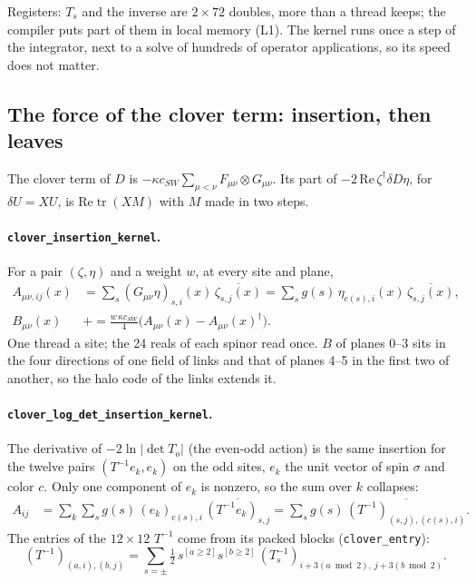 \documentclass[11pt,a4paper]{article}
\numberwithin{equation}{section}
\newcommand{\code}[1]{\texttt{\small #1}}
\newcommand{\dg}{^{\dagger}}
\newcommand{\tr}{\operatorname{tr}}
\begin{document}
Registers: $T_s$ and the inverse are $2\times72$ doubles, more than a thread keeps; the compiler
puts part of them in local memory (L1). The kernel runs once a step of the integrator, next to a
solve of hundreds of operator applications, so its speed does not matter.

\subsection{The force of the clover term: insertion, then leaves}

The clover term of $D$ is $-\kappa c_{SW}\sum_{\mu<\nu}F_{\mu\nu}\otimes G_{\mu\nu}$. Its part of
$-2\,\mathrm{Re}\,\zeta\dg\delta D\eta$, for $\delta U = XU$, is $\mathrm{Re}\tr(XM)$ with $M$
made in two steps.

\paragraph{\code{clover\_insertion\_kernel}.} For a pair $(\zeta,\eta)$ and a weight $w$, at every
site and plane,
\begin{align}
A_{\mu\nu,ij}(x) &= \sum_{s}(G_{\mu\nu}\eta)_{s,i}(x)\,\overline{\zeta_{s,j}(x)}
 = \sum_s g(s)\,\eta_{c(s),i}(x)\,\overline{\zeta_{s,j}(x)},\\
B_{\mu\nu}(x) &\mathrel{+}= \frac{w\,\kappa c_{SW}}{4}\big(A_{\mu\nu}(x) - A_{\mu\nu}(x)\dg\big).
\end{align}
One thread a site; the 24 reals of each spinor read once. $B$ of planes 0–3 sits in the four
directions of one field of links and that of planes 4–5 in the first two of another, so the halo
code of the links extends it.

\paragraph{\code{clover\_log\_det\_insertion\_kernel}.} The derivative of $-2\ln|\det T_o|$ (the
even-odd action) is the same insertion for the twelve pairs $(T^{-1}e_k, e_k)$ on the odd sites,
$e_k$ the unit vector of spin $\sigma$ and color $c$. Only one component of $e_k$ is nonzero, so
the sum over $k$ collapses:
\begin{align}
A_{ij} &= \sum_{k}\sum_s g(s)\,(e_k)_{c(s),i}\,\overline{(T^{-1}e_k)_{s,j}}
 = \sum_s g(s)\,\overline{(T^{-1})_{(s,j),(c(s),i)}} .
\end{align}
The entries of the $12\times12$ $T^{-1}$ come from its packed blocks (\code{clover\_entry}):
\begin{equation}
(T^{-1})_{(a,i),(b,j)} = \sum_{s=\pm}\tfrac12\,s^{[a\ge2]}s^{[b\ge2]}\,(T_s^{-1})_{i+3(a\bmod2),\,j+3(b\bmod2)} .
\end{equation}
\end{document}

